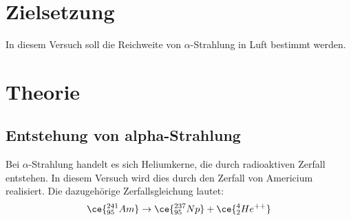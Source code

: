 \section{Zielsetzung}
\label{sec:Zielsetzung}

In diesem Versuch soll die Reichweite von $\alpha$-Strahlung in Luft bestimmt werden.

\section{Theorie}
\subsection{Entstehung von alpha-Strahlung}
Bei $\alpha$-Strahlung handelt es sich Heliumkerne, die durch radioaktiven Zerfall entstehen.
In diesem Versuch wird dies durch den Zerfall von Americium realisiert.
Die dazugehörige Zerfallsgleichung lautet:
\begin{equation}
  \ce{^{241}_{95}Am}\rightarrow\ce{^{237}_{95}Np} + \ce{^{4}_{2} He^{++}}
\end{equation}

